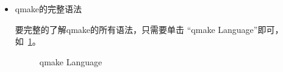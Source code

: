 \begin{itemize}
\item qmake的完整语法

要完整的了解qmake的所有语法，只需要单击
“qmake Language”即可，
如\figurename\ \ref{p000005}。
\begin{figure}[htb] %
\marginnote{\setlength\fboxsep{2pt}\fbox{\footnotesize{\kaishu\figurename\,}\footnotesize{\ref{p000005}}}}\centering %
\setlength\fboxsep{-1pt} %
\caption{qmake Language} %
\label{p000005} %
\end{figure}


\end{itemize}



















